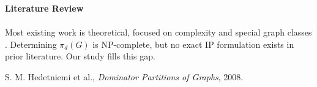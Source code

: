 \documentclass[12pt]{article}
\begin{document}
\textbf{\large Literature Review}
\vspace*{-2mm}

\paragraph{} Most existing work is theoretical, focused on complexity and special graph classes \cite{dominator_partitions}. Determining $\pi_d(G)$ is NP-complete, but no exact IP formulation exists in prior literature. Our study fills this gap.

\small

\begin{thebibliography}{9}
S. M. Hedetniemi et al., \textit{Dominator Partitions of Graphs}, 2008.
\end{thebibliography}
\end{document}
